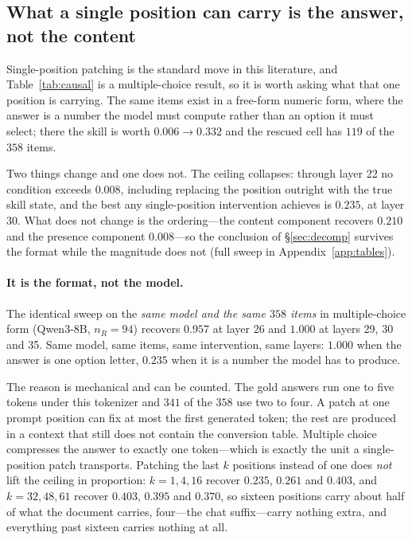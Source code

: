 \subsection{What a single position can carry is the answer, not the content}


Single-position patching is the standard move in this literature, and
Table~\ref{tab:causal} is a multiple-choice result, so it is worth asking what
that one position is carrying. The same items exist in a free-form numeric form,
where the answer is a number the model must compute rather than an option it
must select; there the skill is worth $0.006 \to 0.332$ and the rescued cell
has $119$ of the $358$ items.

Two things change and one does not. The ceiling collapses: through layer 22 no
condition exceeds $0.008$, including replacing the position outright with the
true skill state, and the best any single-position intervention achieves is
$0.235$, at layer 30. What does not change is the ordering---the content
component recovers $0.210$ and the presence component $0.008$---so the
conclusion of \S\ref{sec:decomp} survives the format while the magnitude does
not (full sweep in Appendix~\ref{app:tables}).

\paragraph{It is the format, not the model.} The identical sweep on the
\emph{same model and the same $358$ items} in multiple-choice form (Qwen3-8B,
$n_R=94$) recovers $0.957$ at layer 26 and $1.000$ at layers 29, 30 and 35.
Same model, same items, same intervention, same layers: $1.000$ when the answer
is one option letter, $0.235$ when it is a number the model has to produce.

The reason is mechanical and can be counted. The gold answers run one to five
tokens under this tokenizer and $341$ of the $358$ use two to four. A patch at
one prompt position can fix at most the first generated token; the rest are
produced in a context that still does not contain the conversion table.
Multiple choice compresses the answer to exactly one token---which is exactly
the unit a single-position patch transports. Patching the last $k$ positions
instead of one does \emph{not} lift the ceiling in proportion: $k=1,4,16$
recover $0.235$, $0.261$ and $0.403$, and $k=32,48,61$ recover $0.403$, $0.395$
and $0.370$, so sixteen positions carry about half of what the document carries,
four---the chat suffix---carry nothing extra, and everything past sixteen
carries nothing at all.

